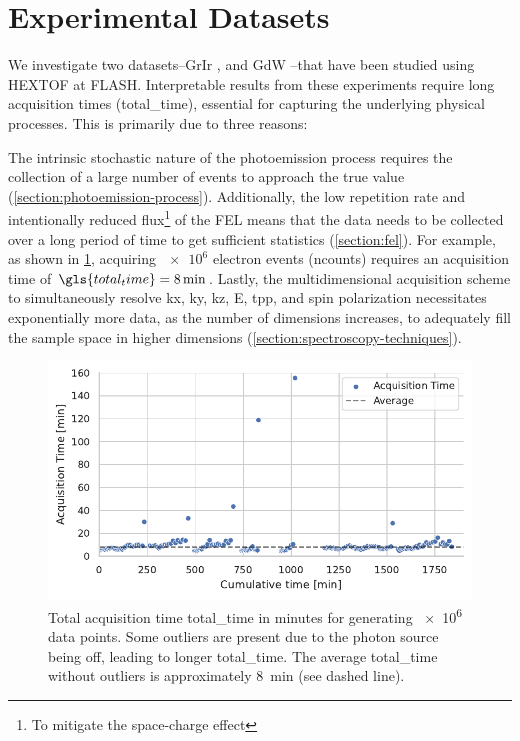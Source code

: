 \section{Experimental Datasets}\label{section:datasets}
We investigate two datasets--\gls{GrIr} \cite{heberMultispectralTimeresolvedEnergy2022}, and \gls{GdW} \cite{kutnyakhovMultidimensionalPhotoemissionSpectra2024}--that have been studied using \gls{HEXTOF} at \gls{FLASH}. Interpretable results from these experiments require long acquisition times (\gls{total_time}), essential for capturing the underlying physical processes. This is primarily due to three reasons:

The intrinsic stochastic nature of the photoemission process requires the collection of a large number of events to approach the true value (\cref{section:photoemission-process}). Additionally, the low repetition rate and intentionally reduced flux\footnote{To mitigate the space-charge effect} of the \gls{FEL} means that the data  needs to be collected over a long period of time to get sufficient statistics (\cref{section:fel}). For example, as shown in \cref{fig:acq-time-1M}, acquiring $\num{e6}$ electron events (\gls{ncounts})  requires an acquisition time of $\gls{total_time}=\qty{8}{\min}$. Lastly, the multidimensional acquisition scheme to simultaneously resolve \gls{kx}, \gls{ky}, \gls{kz}, \gls{E}, \gls{tpp}, and spin polarization necessitates exponentially  more data, as the number of dimensions increases, to adequately fill the sample space in higher dimensions (\cref{section:spectroscopy-techniques}).

\begin{figure}[h]
    \centering
    \includegraphics[width=0.8\linewidth]{images/acq_time_1M.pdf}
    \caption{Total acquisition time \gls{total_time} in minutes for generating \num{e6} data points. Some outliers are present due to the photon source being off, leading to longer \gls{total_time}. The average \gls{total_time} without outliers is approximately \qty{8}{min} (see dashed line).}
    \label{fig:acq-time-1M}
\end{figure}

